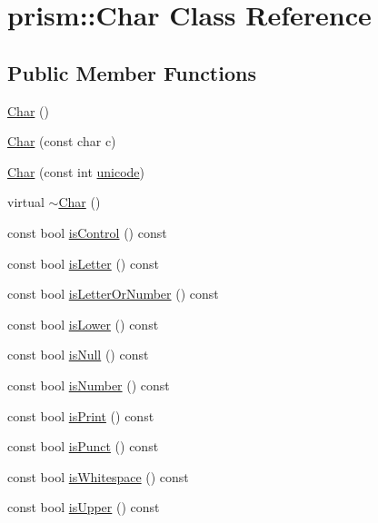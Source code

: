 \hypertarget{classprism_1_1_char}{}\section{prism\+:\+:Char Class Reference}
\label{classprism_1_1_char}
\subsection*{Public Member Functions}
\begin{DoxyCompactItemize}
\item 
\hyperlink{classprism_1_1_char_ae5e69d2f43f9c357cd2abcbf96c835cb}{Char} ()
\item 
\hyperlink{classprism_1_1_char_ad3d23a1b70477b29e1ffdfe8c0c6ac73}{Char} (const char c)
\item 
\hyperlink{classprism_1_1_char_ae2087acf4d77029720cbaecc86f0d8a6}{Char} (const int \hyperlink{classprism_1_1_char_aca9ed86a1bdd3105a97cf60396b8e943}{unicode})
\item 
virtual \hyperlink{classprism_1_1_char_afc29be532b42a6ac97005741d867d73a}{$\sim$\+Char} ()
\item 
const bool \hyperlink{classprism_1_1_char_a55142ba6fb3b81b089bae99a010db8a7}{is\+Control} () const 
\item 
const bool \hyperlink{classprism_1_1_char_a588ec1d5a5f8533ff6ec7664b93978dc}{is\+Letter} () const 
\item 
const bool \hyperlink{classprism_1_1_char_adfd1a3e0892573b4f7259e1985807fb7}{is\+Letter\+Or\+Number} () const 
\item 
const bool \hyperlink{classprism_1_1_char_af79d4d532aff44db259852b28fdb8890}{is\+Lower} () const 
\item 
const bool \hyperlink{classprism_1_1_char_a9869d8f45403bf30072bfd6d8b7374f1}{is\+Null} () const 
\item 
const bool \hyperlink{classprism_1_1_char_aae5ca384e263d56a9c0dfcc22707e24a}{is\+Number} () const 
\item 
const bool \hyperlink{classprism_1_1_char_aaaf4ddff3e581eb615c134bc59fc6950}{is\+Print} () const 
\item 
const bool \hyperlink{classprism_1_1_char_a573352d2881fc11c90eb0a19b98f0325}{is\+Punct} () const 
\item 
const bool \hyperlink{classprism_1_1_char_a734f3cebcb96e155e9d120a416f7bf74}{is\+Whitespace} () const 
\item 
const bool \hyperlink{classprism_1_1_char_a6f51555989b72ca424a515a5fb6471a9}{is\+Upper} () const 

\end{DoxyCompactItemize}
